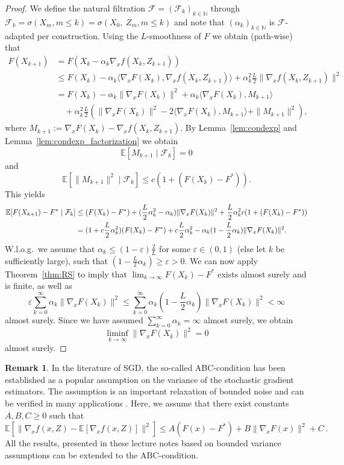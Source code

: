 \documentclass[12pt,openany]{book}
\theoremstyle{definition}
\newtheorem{remark}[thm]{Remark}
\theoremstyle{definition}
\newcommand{\cF}{\mathcal{F}}
\newcommand{\E}{\mathbb{E}}
\newcommand{\N}{\mathbb{N}}
\begin{document}
\begin{proof}
We define the natural filtration $\cF = (\cF_k)_{k\in\N}$ through $\cF_k=\sigma(X_m,m\le k)= \sigma(X_0,\ Z_m,m\le k)$ and note that $(\alpha_k)_{k\in\N}$ is $\cF$-adapted per construction. Using the $L$-smoothness of $F$ we obtain (path-wise) that
\begin{align*}
F(X_{k+1}) &= F(X_k-\alpha_k \nabla_x f(X_k,Z_{k+1})) \\ &\le F(X_k) -\alpha_k \langle \nabla_x F(X_k),\nabla_x f(X_k,Z_{k+1})\rangle + \alpha_k^2 \frac{L}2 \|\nabla_x f(X_k,Z_{k+1})\|^2\\
& = F(X_k) -\alpha_k \|\nabla_x F(X_k)\|^2+\alpha_k \langle \nabla_x F(X_k),M_{k+1}\rangle\\&\quad + \alpha_k^2 \frac{L}2(\|\nabla_x F(X_k)\|^2-2\langle \nabla_x F(X_k), M_{k+1}\rangle + \|M_{k+1}\|^2),
\end{align*}
where $M_{k+1} := \nabla_x F(X_k) - \nabla_x f(X_k,Z_{k+1})$. By Lemma~\ref{lem:condexp} and Lemma~\ref{lem:condexp_factorization} we obtain \[\E[M_{k+1}\mid \cF_k] = 0\] and
\[ \E[\|M_{k+1}\|^2\mid \cF_k]\le c (1+ (F(X_k)-F^\ast)). \]
This yields
\begin{align}\label{eq:smooth_condexpest}
\E[F(X_{k+1})-F^\ast\mid \cF_k] &\le (F(X_k) - F^\ast) + (\frac{L}{2}\alpha_k^2-\alpha_k) \|\nabla_x F(X_k)\|^2 + \frac{L}{2}\alpha_k^2 c (1 + (F(X_k)-F^\ast)) \notag\\
&=(1+c\frac{L}{2}\alpha_k^2) (F(X_k)-F^\ast) + c\frac{L}{2}\alpha_k^2 - \alpha_k (1-\frac{L}{2}\alpha_k)\|\nabla_x F(X_k)\|^2.
\end{align}
W.l.o.g.~we assume that $\alpha_k \le (1-\varepsilon)\frac{2}{L}$ for some $\varepsilon\in(0,1)$ (else let $k$ be sufficiently large), such that
$(1-\frac{L}{2}\alpha_k)\ge\varepsilon> 0$. We can now apply Theorem~\ref{thm:RS} to imply that $\lim_{k\to\infty} F(X_k)-F^\ast$ exists almost surely and is finite, as well as
\[\varepsilon \sum_{k=0}^\infty \alpha_k\|\nabla_x F(X_k)\|^2\le \sum_{k=0}^\infty \alpha_k (1-\frac{L}{2}\alpha_k)\|\nabla_x F(X_k)\|^2<\infty  \]
almost surely. Since we have assumed $\sum_{k=0}^\infty \alpha_k =\infty$ almost surely, 
we obtain
\[\liminf_{k\to\infty} \|\nabla_x F(X_k)\|^2 = 0 \]
almost surely.
\end{proof}

\begin{remark}
    In the literature of SGD, the so-called ABC-condition has been established as a popular assumption on the variance of the stochastic gradient estimators. The assumption is an important relaxation of bounded noise and can be verified in many applications \cite{gower2021sgd,khaled2022better}. Here, we assume that there exist constants $A,B,C\ge0$ such that
    \[\E[\|\nabla_x f(x,Z)-\E[\nabla_x f(x,Z)]\|^2] \le A(F(x)-F^\ast) + B\|\nabla_x F(x)\|^2+C\,. \]
    All the results, presented in these lecture notes based on bounded variance assumptions can be extended to the ABC-condition.
\end{remark}
\end{document}

